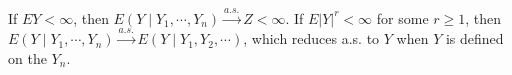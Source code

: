 If $EY < \infty$, then $E(Y \mid Y_1, \cdots, Y_n) \xrightarrow{a.s.} Z < \infty$. If $E|Y|^r < \infty$ for some $r \geq 1$, then $E(Y \mid Y_1, \cdots, Y_n) \xrightarrow{a.s.} E(Y \mid Y_1, Y_2, \cdots)$, which reduces a.s. to $Y$ when $Y$ is defined on the $Y_n$.

